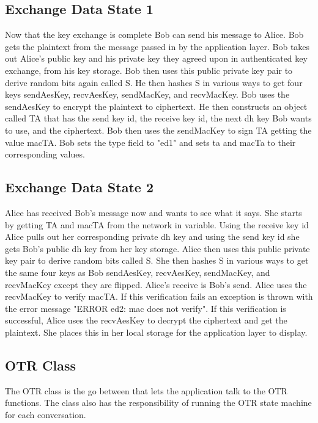 \subsection{Exchange Data State 1}


Now that the key exchange is complete Bob can send his message to Alice. Bob gets the plaintext from the message passed in by the application layer. Bob takes out Alice's public key and his private key they agreed upon in authenticated key exchange, from his key storage. Bob then uses this public private key pair to derive random bits again called S. He then hashes S in various ways to get four keys sendAesKey, recvAesKey, sendMacKey, and recvMacKey. Bob uses the sendAesKey to encrypt the plaintext to ciphertext. He then constructs an object called TA that has the send key id, the receive key id, the next dh key Bob wants to use, and the ciphertext. Bob then uses the sendMacKey to sign TA getting the value macTA. Bob sets the type field to "ed1" and sets ta and macTa to their corresponding values.
 
\subsection{Exchange Data State 2}


Alice has received Bob's message now and wants to see what it says. She starts by getting TA and macTA from the network in variable. Using the receive key id Alice pulls out her corresponding private dh key and using the send key id she gets Bob's public dh key from her key storage. Alice then uses this public private key pair to derive random bits called S. She then hashes S in various ways to get the same four keys as Bob sendAesKey, recvAesKey, sendMacKey, and recvMacKey except they are flipped. Alice's receive is Bob's send. Alice uses the recvMacKey to verify macTA. If this verification fails an exception is thrown with the error message "ERROR ed2: mac does not verify". If this verification is successful, Alice uses the recvAesKey to decrypt the ciphertext and get the plaintext. She places this in her local storage for the application layer to display.


\subsection{OTR Class}


The OTR class is the go between that lets the application talk to the OTR functions. The class also has the responsibility of running the OTR state machine for each conversation. 


